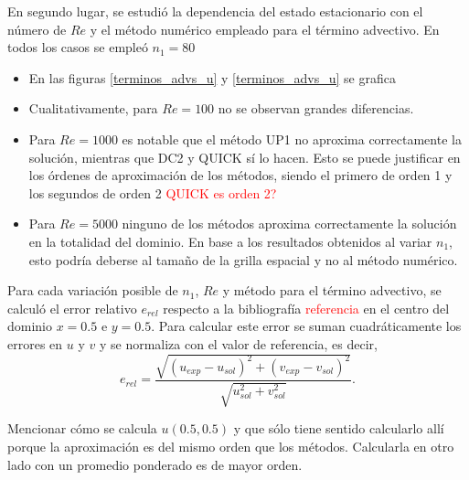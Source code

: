 \documentclass[aps,prb,twocolumn,superscriptaddress,floatfix,longbibliography,10pt]{revtex4-2}
\newif\ifptitle
\newif\ifpnumber
\newcounter{para}
\newcommand\ptitle[1]{\par\refstepcounter{para}
{\ifpnumber{\noindent\textcolor{lightgray}{\textbf{\thepara}}\indent}\fi}
{\ifptitle{\textbf{[{#1}]}}\fi}}
\begin{document}
\ptitle{Comparación cualitativa entre métodos numéricos para distintos Re}
En segundo lugar, se estudió la dependencia del estado estacionario con el número de $Re$ y el método numérico empleado para el término advectivo. En todos los casos se empleó $n_1 = 80$

\begin{itemize}
  \item En las figuras \ref{terminos_advs_u} y \ref{terminos_advs_u} se grafica
  \item Cualitativamente, para $Re = 100$ no se observan grandes diferencias.
  \item Para $Re = 1000$ es notable que el método UP1 no aproxima correctamente la solución, mientras que DC2 y QUICK sí lo hacen. Esto se puede justificar en los órdenes de aproximación de los métodos, siendo el primero de orden 1 y los segundos de orden 2 \textcolor{red}{QUICK es orden 2?}
  \item Para $Re = 5000$ ninguno de los métodos aproxima correctamente la solución en la totalidad del dominio. En base a los resultados obtenidos al variar $n_1$, esto podría deberse al tamaño de la grilla espacial y no al método numérico.
\end{itemize}

\ptitle{Comparación numérica entre métodos numéricos para distintos $Re$.}
Para cada variación posible de $n_1$, $Re$ y método para el término advectivo, se calculó el error relativo $e_{rel}$ respecto a la bibliografía \textcolor{red}{referencia} en el centro del dominio $x = 0.5$ e $y = 0.5$. Para calcular este error se suman cuadráticamente los errores en $u$ y $v$ y se normaliza con el valor de referencia, es decir,
\[e_{rel} = \frac{\sqrt{(u_{exp} - u_{sol})^2 + (v_{exp} - v_{sol})^2}}{\sqrt{u_{sol}^2 + v_{sol}^2}}. \]

Mencionar cómo se calcula $u(0.5,0.5)$ y que sólo tiene sentido calcularlo allí porque la aproximación es del mismo orden que los métodos. Calcularla en otro lado con un promedio ponderado es de mayor orden.
\end{document}
